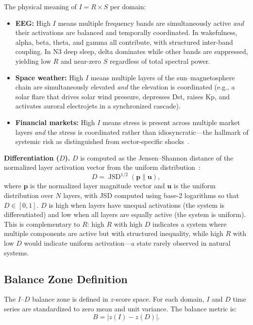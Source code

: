 \documentclass[aip,cha,reprint,amsmath,amssymb]{revtex4-2}
\begin{document}
The physical meaning of $I = R \times S$ per domain:
\begin{itemize}
\item \textbf{EEG:} High $I$ means multiple frequency bands are simultaneously active \emph{and} their activations are balanced and temporally coordinated. In wakefulness, alpha, beta, theta, and gamma all contribute, with structured inter-band coupling. In N3 deep sleep, delta dominates while other bands are suppressed, yielding low $R$ and near-zero $S$ regardless of total spectral power.
\item \textbf{Space weather:} High $I$ means multiple layers of the sun--magnetosphere chain are simultaneously elevated \emph{and} the elevation is coordinated (e.g., a solar flare that drives solar wind pressure, depresses Dst, raises Kp, and activates auroral electrojets in a synchronized cascade).
\item \textbf{Financial markets:} High $I$ means stress is present across multiple market layers \emph{and} the stress is coordinated rather than idiosyncratic---the hallmark of systemic risk as distinguished from sector-specific shocks~\cite{forbes2002}.
\end{itemize}

\textbf{Differentiation ($D$).} $D$ is computed as the Jensen--Shannon distance of the normalized layer activation vector from the uniform distribution~\cite{lin1991,endres2003}:
\begin{equation}
D = \operatorname{JSD}^{1/2}\left(\mathbf{p} \| \mathbf{u}\right),
\end{equation}
where $\mathbf{p}$ is the normalized layer magnitude vector and $\mathbf{u}$ is the uniform distribution over $N$ layers, with JSD computed using base-2 logarithms so that $D \in [0, 1]$. $D$ is high when layers have unequal activations (the system is differentiated) and low when all layers are equally active (the system is uniform). This is complementary to $R$: high $R$ with high $D$ indicates a system where multiple components are active but with structured inequality, while high $R$ with low $D$ would indicate uniform activation---a state rarely observed in natural systems.

\subsection{Balance Zone Definition}

The $I$--$D$ balance zone is defined in $z$-score space. For each domain, $I$ and $D$ time series are standardized to zero mean and unit variance. The balance metric is:
\begin{equation}
B = |z(I) - z(D)|.
\end{equation}
\end{document}

